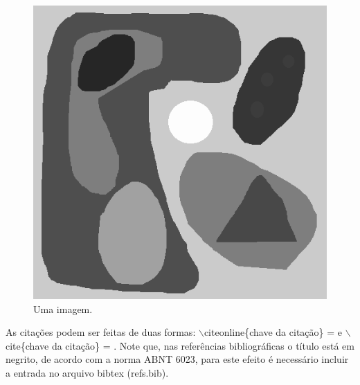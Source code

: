 \documentclass[courier]{uninove-ppgi}
\begin{document}
\begin{figure}[ht!]

	\begin{center}
	
		\includegraphics[scale=0.4]{leveling1}
	
	\end{center}
	
	\caption{Uma imagem.}
	
	
\end{figure}

As citações podem ser feitas de duas formas: {\color{red}$\backslash$citeonline}\{chave da citação\} =  e {\color{red}$\backslash$cite}\{chave da citação\} = \cite{seymor:book:1971}. Note que, nas referências bibliográficas o título está em negrito, de acordo com a norma ABNT 6023, para este efeito é necessário incluir a entrada no arquivo bibtex (refs.bib).



		   
\end{document}

